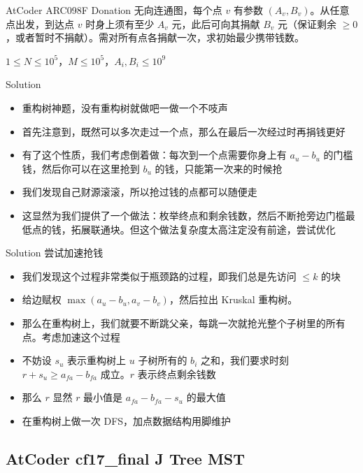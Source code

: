 ﻿\documentclass[aspectratio=169]{ctexbeamer}
\begin{document}
\begin{frame}{AtCoder ARC098F Donation}
      无向连通图，每个点 $v$ 有参数 $(A_v,B_v)$。从任意点出发，到达点 $v$ 时身上须有至少 $A_v$ 元，此后可向其捐献 $B_v$ 元（保证剩余 $\ge 0$，或者暂时不捐献）。需对所有点各捐献一次，求初始最少携带钱数。
      
      $1\le N\le 10^5$，$M\le 10^5$，$A_i,B_i\le 10^9$
\end{frame}

\begin{frame}{Solution}
    \begin{itemize}
        \item 重构树神题，没有重构树就做吧一做一个不吱声
        \item 首先注意到，既然可以多次走过一个点，那么在最后一次经过时再捐钱更好
        \item 有了这个性质，我们考虑倒着做：每次到一个点需要你身上有 $a_u-b_u$ 的门槛钱，然后你可以在这里抢到 $b_u$ 的钱，只能第一次来的时候抢
        \item 我们发现自己财源滚滚，所以抢过钱的点都可以随便走
        \item 这显然为我们提供了一个做法：枚举终点和剩余钱数，然后不断抢旁边门槛最低点的钱，拓展联通块。但这个做法复杂度太高注定没有前途，尝试优化
    \end{itemize}
\end{frame}

\begin{frame}{Solution}
    尝试加速抢钱
    \begin{itemize}
        \item 我们发现这个过程非常类似于瓶颈路的过程，即我们总是先访问 $\le k$ 的块
        \item 给边赋权 $\max(a_u-b_u,a_v-b_v)$，然后拉出 Kruskal 重构树。
        \item 那么在重构树上，我们就要不断跳父亲，每跳一次就抢光整个子树里的所有点。考虑加速这个过程
        \item 不妨设 $s_u$ 表示重构树上 $u$ 子树所有的 $b_i$ 之和，我们要求时刻 $r+s_u\ge a_{fa}-b_{fa}$ 成立。$r$ 表示终点剩余钱数
        \item 那么 $r$ 显然 $r$ 最小值是 $a_{fa}-b_{fa}-s_u$ 的最大值
        \item 在重构树上做一次 DFS，加点数据结构用脚维护
    \end{itemize}
\end{frame}

\subsection{AtCoder cf17\_final J Tree MST}
\end{document}
